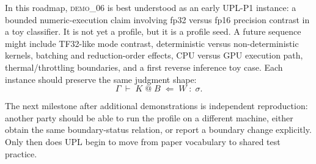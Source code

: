 \documentclass[11pt, a4paper]{article}
\theoremstyle{upldef}
\begin{document}
In this roadmap, \textsc{demo\_06} is best understood as an early
UPL-P1 instance: a bounded numeric-execution claim involving fp32
versus fp16 precision contrast in a toy classifier. It is not yet a
profile, but it is a profile seed. A future sequence might include
TF32-like mode contrast, deterministic versus non-deterministic
kernels, batching and reduction-order effects, CPU versus GPU
execution path, thermal/throttling boundaries, and a first reverse
inference toy case. Each instance should preserve the same judgment
shape:
\[
\Gamma \;\vdash\; K \;@\; B \;\Leftarrow\; W \;:\; \sigma.
\]

The next milestone after additional demonstrations is independent
reproduction: another party should be able to run the profile on a
different machine, either obtain the same boundary-status relation,
or report a boundary change explicitly. Only then does UPL begin to
move from paper vocabulary to shared test practice.
\end{document}
